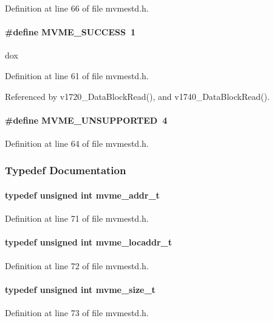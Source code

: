 Definition at line 66 of file mvmestd.h.
\paragraph[{MVME\_\-SUCCESS}]{\setlength{\rightskip}{0pt plus 5cm}\#define MVME\_\-SUCCESS~1}\hfill\label{group__mvmestdinclude_ga1671785ba0bbf639935547e7b1d3f641}
dox 

Definition at line 61 of file mvmestd.h.

Referenced by v1720\_\-DataBlockRead(), and v1740\_\-DataBlockRead().
\paragraph[{MVME\_\-UNSUPPORTED}]{\setlength{\rightskip}{0pt plus 5cm}\#define MVME\_\-UNSUPPORTED~4}\hfill\label{group__mvmestdinclude_gaea48d85f04ab842c42d90d0d370dcaa1}


Definition at line 64 of file mvmestd.h.

\subsubsection{Typedef Documentation}
\paragraph[{mvme\_\-addr\_\-t}]{\setlength{\rightskip}{0pt plus 5cm}typedef unsigned int {\bf mvme\_\-addr\_\-t}}\hfill\label{group__mvmestdinclude_ga589085bbef4f3f52d4a39a316d743e05}


Definition at line 71 of file mvmestd.h.
\paragraph[{mvme\_\-locaddr\_\-t}]{\setlength{\rightskip}{0pt plus 5cm}typedef unsigned int {\bf mvme\_\-locaddr\_\-t}}\hfill\label{group__mvmestdinclude_ga458ecf14084c55560abf951271875d73}


Definition at line 72 of file mvmestd.h.
\paragraph[{mvme\_\-size\_\-t}]{\setlength{\rightskip}{0pt plus 5cm}typedef unsigned int {\bf mvme\_\-size\_\-t}}\hfill\label{group__mvmestdinclude_ga01d0cfb7d3dd7f89dee14b82d6cd4c3b}


Definition at line 73 of file mvmestd.h.